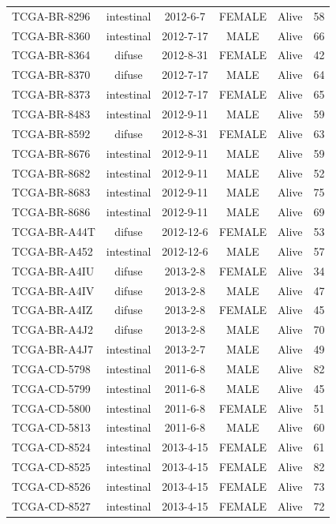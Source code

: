 \documentclass[11pt]{amsart}
\theoremstyle{definition}
\begin{document}
\begin{table}
\begin{center}
\begin{tabular}{lccccc}
TCGA-BR-8296 & intestinal & 2012-6-7 & FEMALE & Alive & 58 \\
TCGA-BR-8360 & intestinal & 2012-7-17 & MALE & Alive & 66 \\
TCGA-BR-8364 & difuse & 2012-8-31 & FEMALE & Alive & 42 \\
TCGA-BR-8370 & difuse & 2012-7-17 & MALE & Alive & 64 \\
TCGA-BR-8373 & intestinal & 2012-7-17 & FEMALE & Alive & 65 \\
TCGA-BR-8483 & intestinal & 2012-9-11 & MALE & Alive & 59 \\
TCGA-BR-8592 & difuse & 2012-8-31 & FEMALE & Alive & 63 \\
TCGA-BR-8676 & intestinal & 2012-9-11 & MALE & Alive & 59 \\
TCGA-BR-8682 & intestinal & 2012-9-11 & MALE & Alive & 52 \\
TCGA-BR-8683 & intestinal & 2012-9-11 & MALE & Alive & 75 \\
TCGA-BR-8686 & intestinal & 2012-9-11 & MALE & Alive & 69 \\
TCGA-BR-A44T & difuse & 2012-12-6 & FEMALE & Alive & 53 \\
TCGA-BR-A452 & intestinal & 2012-12-6 & MALE & Alive & 57 \\
TCGA-BR-A4IU & difuse & 2013-2-8 & FEMALE & Alive & 34 \\
TCGA-BR-A4IV & difuse & 2013-2-8 & MALE & Alive & 47 \\
TCGA-BR-A4IZ & difuse & 2013-2-8 & FEMALE & Alive & 45 \\
TCGA-BR-A4J2 & difuse & 2013-2-8 & MALE & Alive & 70 \\
TCGA-BR-A4J7 & intestinal & 2013-2-7 & MALE & Alive & 49 \\
TCGA-CD-5798 & intestinal & 2011-6-8 & MALE & Alive & 82 \\
TCGA-CD-5799 & intestinal & 2011-6-8 & MALE & Alive & 45 \\
TCGA-CD-5800 & intestinal & 2011-6-8 & FEMALE & Alive & 51 \\
TCGA-CD-5813 & intestinal & 2011-6-8 & MALE & Alive & 60 \\
TCGA-CD-8524 & intestinal & 2013-4-15 & FEMALE & Alive & 61 \\
TCGA-CD-8525 & intestinal & 2013-4-15 & FEMALE & Alive & 82 \\
TCGA-CD-8526 & intestinal & 2013-4-15 & FEMALE & Alive & 73 \\
TCGA-CD-8527 & intestinal & 2013-4-15 & FEMALE & Alive & 72 \\

\end{tabular}
\end{center}
\end{table}
\end{document}
